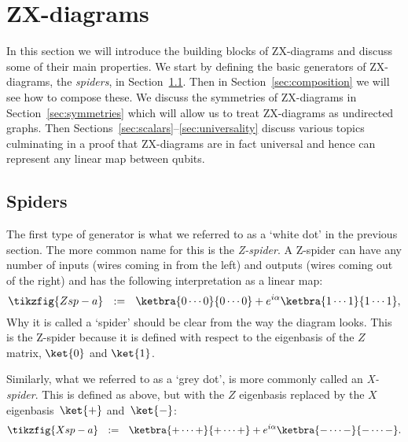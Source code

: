 \documentclass[a4paper,onecolumn,superscriptaddress,11pt,%
				unpublished,%
				allowfontchageintitle,%
				]{quantumarticle}
\begin{document}
\section{ZX-diagrams}\label{sec:zxdiagrams}

In this section we will introduce the building blocks of ZX-diagrams and discuss some of their main properties.
We start by defining the basic generators of ZX-diagrams, the \emph{spiders}, in Section~\ref{sec:spiders}. Then in Section~\ref{sec:composition} we will see how to compose these. We discuss the symmetries of ZX-diagrams in Section~\ref{sec:symmetries} which will allow us to treat ZX-diagrams as undirected graphs. Then Sections~\ref{sec:scalars}--\ref{sec:universality} discuss various topics culminating in a proof that ZX-diagrams are in fact universal and hence can represent any linear map between qubits.

\subsection{Spiders}\label{sec:spiders}

The first type of generator is what we referred to as a `white dot' in the previous section. The more common name for this is the \emph{Z-spider}. A Z-spider can have any number of inputs (wires coming in from the left) and outputs (wires coming out of the right) and has the following interpretation as a linear map:
\begin{equation}\label{eq:Z-spider-def}
\tikzfig{Zsp-a} \ \ :=\ \ \ketbra{0 \cdots 0}{0 \cdots 0} + e^{i \alpha} \ketbra{1 \cdots 1}{1 \cdots 1},
\end{equation}
Why it is called a `spider' should be clear from the way the diagram looks. This is the Z-spider because it is defined with respect to the eigenbasis of the $Z$ matrix, $\ket{0}$ and $\ket{1}$.

Similarly, what we referred to as a `grey dot', is more commonly called an \emph{X-spider}. This is defined as above, but with the $Z$ eigenbasis replaced by the $X$ eigenbasis~$\ket{+}$ and~$\ket{-}$:
\begin{equation}
\tikzfig{Xsp-a} \ \ :=\ \ \ketbra{+ \cdots +}{+ \cdots +} + e^{i \alpha} \ketbra{- \cdots -}{- \cdots -}.
\end{equation}
\end{document}
